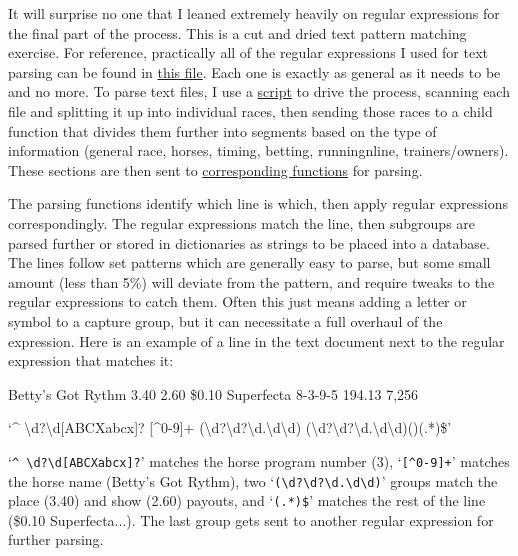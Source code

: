 \documentclass{article}
\begin{document}
It will surprise no one that I leaned extremely heavily on regular expressions for the final part of the process. This is a cut and dried text pattern matching exercise. For reference, practically all of the regular expressions I used for text parsing can be found in \href{https://github.com/Real-Karisch/horseData/blob/master/python/convertPDF/infoFns/regexPatterns.py}{this file}. Each one is exactly as general as it needs to be and no more. To parse text files, I use a \href{https://github.com/Real-Karisch/horseData/blob/master/python/convertPDF/driver.py}{script} to drive the process, scanning each file and splitting it up into individual races, then sending those races to a child function that divides them further into segments based on the type of information (general race, horses, timing, betting, runningnline, trainers/owners). These sections are then sent to \href{https://github.com/Real-Karisch/horseData/tree/master/python/convertPDF/infoFns}{corresponding functions} for parsing. 

The parsing functions identify which line is which, then apply regular expressions correspondingly. The regular expressions match the line, then subgroups are parsed further or stored in dictionaries as strings to be placed into a database. The lines follow set patterns which are generally easy to parse, but some small amount (less than 5\%) will deviate from the pattern, and require tweaks to the regular expressions to catch them. Often this just means adding a letter or symbol to a capture group, but it can necessitate a full overhaul of the expression. Here is an example of a line in the text document next to the regular expression that matches it:
\bigbreak

\ttfamily
{} Betty's Got Rythm 3.40 2.60 \$0.10 Superfecta 8-3-9-5 194.13 7,256
\bigbreak

\noindent `\^{} \textbackslash d?\textbackslash d[ABCXabcx]? [\^{}0-9]+ (\textbackslash d?\textbackslash d?\textbackslash d.\textbackslash d\textbackslash d) (\textbackslash d?\textbackslash d?\textbackslash d.\textbackslash d\textbackslash d)()(.*)\$'

\bigbreak

\rmfamily

`\texttt{\^{} \textbackslash d?\textbackslash d[ABCXabcx]?}' matches the horse program number (3), `\texttt{[\^{}0-9]+}' matches the horse name (Betty's Got Rythm), two `\texttt{(\textbackslash d?\textbackslash d?\textbackslash d.\textbackslash d\textbackslash d)}' groups match the place (3.40) and show (2.60) payouts, and `\texttt{(.*)\$}' matches the rest of the line (\$0.10 Superfecta...). The last group gets sent to another regular expression for further parsing.
\end{document}
